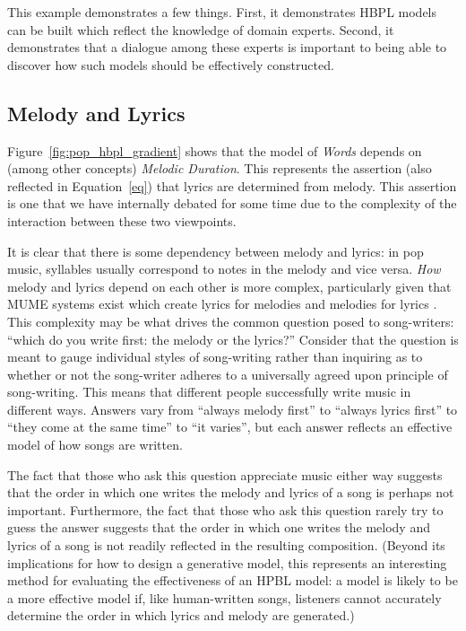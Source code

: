 \documentclass[letterpaper]{article}
\begin{document}
This example demonstrates a few things. First, it demonstrates HBPL models can be built which reflect the knowledge of domain experts. Second, it demonstrates that a dialogue among these experts is important to being able to discover how such models should be effectively constructed.

\subsection{Melody and Lyrics}

Figure~\ref{fig:pop_hbpl_gradient} shows that the model of \emph{Words} depends on (among other concepts) \emph{Melodic Duration}. This represents the assertion (also reflected in Equation~\ref{eq}) that lyrics are determined from melody. This assertion is one that we have internally debated for some time due to the complexity of the interaction between these two viewpoints.

It is clear that there is some dependency between melody and lyrics: in pop music, syllables usually correspond to notes in the melody and vice versa. \emph{How} melody and lyrics depend on each other is more complex, particularly given that MUME systems exist which create lyrics for melodies \cite{ramakrishnan2009automatic} and melodies for lyrics \cite{monteith2012automatic}. This complexity may be what drives the common question posed to song-writers: ``which do you write first: the melody or the lyrics?'' Consider that the question is meant to gauge individual styles of song-writing rather than inquiring as to whether or not the song-writer adheres to a universally agreed upon principle of song-writing. This means that different people successfully write music in different ways. Answers vary from ``always melody first'' to ``always lyrics first'' to ``they come at the same time'' to ``it varies'', but each answer reflects an effective model of how songs are written. 

The fact that those who ask this question appreciate music either way suggests that the order in which one writes the melody and lyrics of a song is perhaps not important. Furthermore, the fact that those who ask this question rarely try to guess the answer suggests that the order in which one writes the melody and lyrics of a song is not readily reflected in the resulting composition. (Beyond its implications for how to design a generative model, this represents an interesting method for evaluating the effectiveness of an HPBL model: a model is likely to be a more effective model if, like human-written songs, listeners cannot accurately determine the order in which lyrics and melody are generated.)
\end{document}
